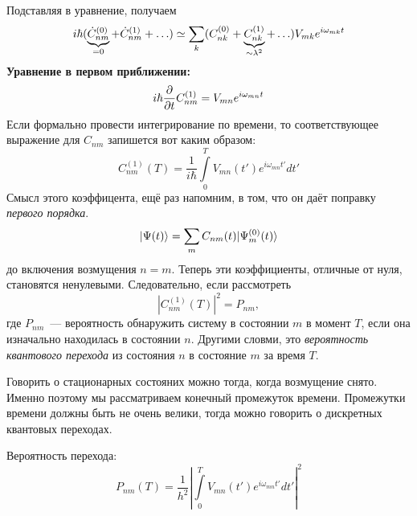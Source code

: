 \begin{itemize}
Подставляя в уравнение, получаем
$$
    i \hbar (\underbrace{\dot C_{nm}^{(0)}}_{=0} + \dot C_{nm}^{(1)} + \ldots) \simeq
    \sum_k (C_{nk} ^{(0)} + \underbrace{C_{nk} ^{(1)}}_{\sim \lambda^2} + \ldots) V_{mk} e^{i \omega_{mk} t}\\ 
$$
\textbf{Уравнение в первом приближении:}
$$
    i \hbar \dfrac{\partial}{\partial t} C_{nm}^{(1)} = V_{mn} e^{i \omega_{mn} t}
$$
Если формально провести интегрирование по времени, то соответствующее выражение для $C_{nm}$ запишется вот каким образом:
$$
    C_{nm}^{(1)} (T) = \dfrac{1}{i\hbar} \int\limits_{0}^{T} V_{mn} (t') e^{i\omega_{mn} t'} dt'
$$
Смысл этого коэффицента, ещё раз напомним, в том, что он даёт поправку \emph{первого порядка}.
$$
    | \Psi(t) \rangle = \sum_{m} C_{nm} (t) | \Psi_m^{(0)} (t) \rangle
$$
до включения возмущения $n = m$. Теперь эти коэффициенты, отличные от нуля, становятся ненулевыми. Следовательно, если рассмотреть
$$
    |C_{nm}^{(1)} (T)|^2 = P_{nm},
$$
где $P_{nm}$~--- вероятность обнаружить систему в состоянии $m$ в момент $T$, если она изначально находилась в состоянии $n$. Другими словми, это \emph{вероятность квантового перехода} из состояния $n$ в состояние $m$ за время $T$.
\end{itemize} 

Говорить о стационарных состояних можно тогда, когда возмущение снято. Именно поэтому мы рассматриваем конечный промежуток времени. Промежутки времени должны быть не очень велики, тогда можно говорить о дискретных квантовых переходах.

Вероятность перехода:
$$
    P_{nm} (T) = \dfrac{1}{h^2}\left|
\int\limits_{0}^{T} V_{mn} (t') e^{i\omega_{mn} t'} dt'
    \right|^2
$$

